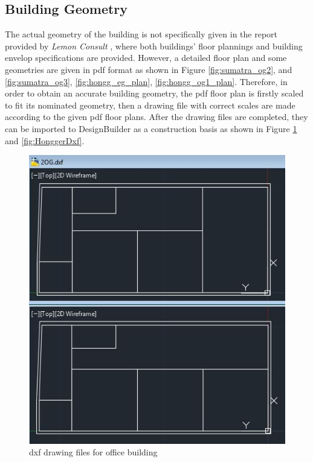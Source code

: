 \documentclass[a4paper, oneside]{discothesis}
\begin{document}
		\subsection{Building Geometry}
			The actual geometry of the building is not specifically given in the report provided by \textit{Lemon Consult} \cite{SIAPreviousreport}, where both buildings' floor plannings and building envelop specifications are provided. However, a detailed floor plan and some geometries are given in pdf format as shown in Figure \ref{fig:sumatra_og2}, and \ref{fig:sumatra_og3}, \ref{fig:hongg_eg_plan}, \ref{fig:hongg_og1_plan}. Therefore, in order to obtain an accurate building geometry, the pdf floor plan is firstly scaled to fit its nominated geometry, then a drawing file with correct scales are made according to the given pdf floor plans. After the drawing files are completed, they can be imported to DesignBuilder as a construction basis as shown in Figure \ref{fig:SumatraDxf} and \ref{fig:HonggerDxf}.

			\begin{figure}[H]
			\centering
			\includegraphics[scale=0.6]{Sumatra_dxf.jpg}
			\caption{dxf drawing files for office building}
			\label{fig:SumatraDxf}
			\end{figure}
			
\end{document}
